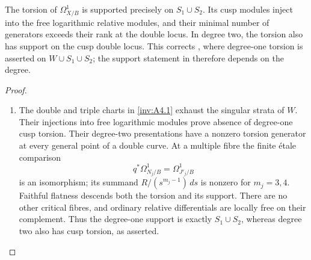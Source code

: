 \begin{proposition}\hypertarget{tag-01S1}{}\label{inv:A4.2}

The torsion of $\Omega_{X/B}^1$ is supported precisely on
$S_1\cup S_2$. Its cusp modules inject into the free logarithmic
relative modules, and their minimal number of generators exceeds
their rank at the double locus. In degree two, the torsion also
has support on the cusp double locus.
This corrects \cite[Remark~9.21, p.~81]{AC2026}, where
degree-one torsion is asserted on $W\cup S_1\cup S_2$;
the support statement in \cite[Remark~1.3, p.~5]{AC2026}
therefore depends on the degree.
\end{proposition}


\begin{proof}
\begin{enumerate}[label=\arabic*.,leftmargin=*]
\item The double and triple charts in \cref{inv:A4.1} exhaust the
singular strata of $W$. Their injections into free logarithmic
modules prove absence of degree-one cusp torsion. Their degree-two
presentations have a nonzero torsion generator at every general
point of a double curve. At a multiple fibre the finite \'etale
comparison
\[
q^*\Omega^1_{N_j/B}=\Omega^1_{J'_j/B}
\]
is an isomorphism; its summand $R/(s^{m_j-1})\,ds$ is nonzero
for $m_j=3,4$. Faithful flatness descends both the torsion and its
support. There are no other critical fibres, and ordinary relative
differentials are locally free on their complement. Thus the
degree-one support is exactly $S_1\cup S_2$, whereas degree two
also has cusp torsion, as asserted.
\end{enumerate}
\end{proof}